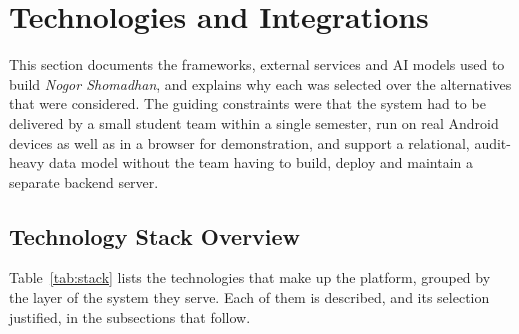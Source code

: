 \documentclass[11pt,a4paper]{article}
\begin{document}
\setcounter{section}{4}

\section{Technologies and Integrations}

This section documents the frameworks, external services and AI models used to
build \emph{Nogor Shomadhan}, and explains why each was selected over the
alternatives that were considered. The guiding constraints were that the system
had to be delivered by a small student team within a single semester, run on real
Android devices as well as in a browser for demonstration, and support a
relational, audit-heavy data model without the team having to build, deploy and
maintain a separate backend server.

\subsection{Technology Stack Overview}

Table~\ref{tab:stack} lists the technologies that make up the platform, grouped
by the layer of the system they serve. Each of them is described, and its
selection justified, in the subsections that follow.
\end{document}
